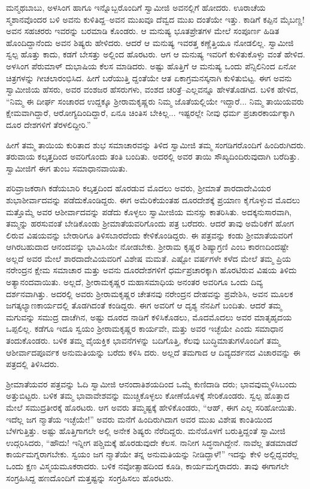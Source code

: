 ಮನ್ಮಥಬಾಬು, ಅಳಸಿಂಗ ಹಾಗೂ ಇನ್ನೊಬ್ಬರೊಂದಿಗೆ ಸ್ವಾಮೀಜಿ ಅವನಲ್ಲಿಗೆ ಹೋದರು. ಊರಾಚೆಯ ಸ್ಮಶಾನವೊಂದರ ಬಳಿ ಅವನು ಕುಳಿತಿದ್ದ–ಅವನ ಮುಖವೂ ದೆವ್ವದ ಮುಖ ದಂತೆಯೇ ಇತ್ತು. ಕಾಡಿಗೆ ಕಪ್ಪಿನ ಮೈಬಣ್ಣ! ಅವನ ಸಹಚರರು ಇವರನ್ನು ಬರಮಾಡಿ ಕೊಂಡರು. ಆ ಮನುಷ್ಯ ಭೂತಪ್ರೇತಗಳ ಮೇಲೆ ಸಂಪೂರ್ಣ ಹಿಡಿತ ಹೊಂದಿದ್ದಾನೆಂದು ಅವನ ಶಿಷ್ಯರು ಹೇಳಿದರು. ಆದರೆ ಆ ಮನುಷ್ಯ ಇವರತ್ತ ಕಣ್ಣೆತ್ತಿಯೂ ನೋಡಲಿಲ್ಲ. ಸ್ವಾಮೀಜಿ ಸ್ವಲ್ಪ ಹೊತ್ತು ಕಾದು, ಕಡಗೆ ಬೇಸತ್ತು ಅಲ್ಲಿಂದ ಹೊರಟರು. ಆಗ ಆ ಮನುಷ್ಯ ಇವರಿಗೆ ಕುಳಿತುಕೊಳ್ಳು ವಂತೆ ಹೇಳಿದ. ಅಳಸಿಂಗ ಪೆರುಮಾಳ್ ದುಭಾಷಿಯ ಕೆಲಸ ಮಾಡಿದರು. ಅಷ್ಟು ಹೊತ್ತಿಗೆ ಆ ಮನುಷ್ಯ ಒಂದು ಪೆನ್ಸಿಲಿನಿಂದ ಏನೋ ಚಿತ್ರಗಳನ್ನು ಗೀಚಲಾರಂಭಿಸಿದ. ಹೀಗೆ ಬರೆಯುತ್ತಿ ದ್ದಂತೆಯೇ ಆತ ಏಕಾಗ್ರಮನಸ್ಕನಾಗಿ ಕುಳಿತುಬಿಟ್ಟ. ಈಗ ಅವನು ಸ್ವಾಮೀಜಿಯ ಹೆಸರು, ಅವರ ವಂಶಜರ ಹೆಸರುಗಳು, ವಂಶದ ಚರಿತ್ರೆ–ಎಲ್ಲವನ್ನೂ ಹೇಳತೊಡಗಿದ. ಬಳಿಕ ಹೇಳಿದ, “ನಿಮ್ಮ ಈ ದೀರ್ಘ ಸಂಚಾರದ ಉದ್ದಕ್ಕೂ ಶ್ರೀರಾಮಕೃಷ್ಣರು ನಿಮ್ಮ ಜೊತೆಯಲ್ಲಿಯೇ ಇದ್ದಾರೆ... ನಿಮ್ಮ ತಾಯಿಯವರು ಕ್ಷೇಮವಾಗಿದ್ದಾರೆ, ಆರೋಗ್ಯದಿಂದಿದ್ದಾರೆ, ಏನೂ ಚಿಂತಿಸ ಬೇಕಿಲ್ಲ... ಇಷ್ಟರಲ್ಲೇ ನೀವು ಧರ್ಮ ಪ್ರಚಾರಕಾರ್ಯಕ್ಕಾಗಿ ದೂರ ದೇಶಗಳಿಗೆ ತೆರಳಲಿದ್ದೀರಿ.”

ಹೀಗೆ ತಮ್ಮ ತಾಯಿಯ ಕುರಿತಾದ ಶುಭ ಸಮಾಚಾರವನ್ನು ತಿಳಿದ ಸ್ವಾಮೀಜಿ ತಮ್ಮ ಸಂಗಡಿಗರೊಂದಿಗೆ ಹಿಂದಿರುಗಿದರು. ತರುವಾಯ ಕಲ್ಕತ್ತದಿಂದ ಅವರಿಗೊಂದು ತಂತಿ ಬಂದಿತು. ಅದರಲ್ಲಿ ಅವರ ತಾಯಿ ಸೌಖ್ಯದಿಂದಿರುವುದಾಗಿ ಬರೆದಿತ್ತು. ಸ್ವಾಮೀಜಿಗೆ ಈಗ ತುಂಬ ಸಮಾಧಾನವಾಯಿತು.

ಪರಿವ್ರಾಜಕರಾಗಿ ಕಡೆಯಬಾರಿ ಕಲ್ಕತ್ತದಿಂದ ಹೊರಡುವ ಮೊದಲು ಅವರು, ಶ್ರೀಮಾತೆ ಶಾರದಾದೇವಿಯರ ಶುಭಾಶೀರ್ವಾದವನ್ನು ಪಡೆದುಕೊಂಡಿದ್ದರು. ಈಗ ಅಮೆರಿಕೆಯಂತಹ ದೂರದೇಶಕ್ಕೆ ಪ್ರಯಾಣ ಕೈಗೊಳ್ಳುವ ಮೊದಲು ಮತ್ತೊಮ್ಮೆ ಅವರ ಆಶೀರ್ವಾದವನ್ನು ಪಡೆದು ಕೊಳ್ಳಲು ಸ್ವಾಮೀಜಿಯ ಮನಸ್ಸು ಕಾತರಿಸಿತು. ಅದಕ್ಕನುಸಾರವಾಗಿ, ತಮ್ಮನ್ನು ಹರಸುವಂತೆ ಬೇಡಿಕೊಂಡು ಶ್ರೀಮಾತೆಯವರಿಗೊಂದು ಪತ್ರ ಬರೆದರು. ಆದರೆ ತಾವು ಅಮೆರಿಕೆಗೆ ಹೋಗ ಲಿರುವ ವಿಷಯವನ್ನು ಬೇರಾರಿಗೂ ತಿಳಿಸಬಾರದೆಂದು ಕೇಳಿಕೊಂಡಿದ್ದರು. ಈ ಪತ್ರವನ್ನು ಕಂಡು ಶ್ರೀಮಾತೆಯವರಿಗೆ ಆಗಿರಬಹುದಾದ ಆನಂದವನ್ನು ಭಾವಿಸಿಯೇ ನೋಡಬೇಕು. ಶ್ರೀರಾಮ ಕೃಷ್ಣರ ಶಿಷ್ಯಾಗ್ರಣಿ ಎಂಬ ಕಾರಣದಿಂದಷ್ಟೇ ಅಲ್ಲದೆ ಅವರ ಮೇಲೆ ಶಾರದಾದೇವಿಯವರಿಗೆ ವಿಶೇಷ ಮಮತೆ. ಎಷ್ಟೋ ವರ್ಷಗಳೇ ಕಳೆದ ಮೇಲೆ ತಮ್ಮ ಪ್ರಿಯ ನರೇಂದ್ರನ ಕ್ಷೇಮ ಸಮಾಚಾರ ಮತ್ತು ಅವನು ದೂರದೇಶಗಳಿಗೆ ಧರ್ಮಪ್ರಚಾರಕ್ಕಾಗಿ ಹೊರಟಿರುವ ವಿಷಯ ತಿಳಿದು ಅತ್ಯಾನಂದವಾಯಿತು. ಅಲ್ಲದೆ, ಶ್ರೀರಾಮಕೃಷ್ಣರ ಮಹಾಸಮಾಧಿಯ ಅನಂತರ ಅವರಿಗೂ ಒಂದು ದಿವ್ಯ ದರ್ಶನವಾಗಿತ್ತು. ಅದರಲ್ಲಿ ಅವರು ಶ್ರೀರಾಮಕೃಷ್ಣರ ಚೇತನವು ನರೇಂದ್ರನ ದೇಹವನ್ನು ಪ್ರವೇಶಿಸಿ, ಅವನ ಮೂಲಕ ಜಗತ್ಕಲ್ಯಾಣಕಾರ್ಯದಲ್ಲಿ ತೊಡಗಿದಂತೆ ಕಂಡಿದ್ದರು. ಈಗ ಅವರಿಗೆ ಆ ದೃಶ್ಯ ನೆನಪಿಗೆ ಬಂದಿತು. ಆದರೆ ತಮ್ಮ ಮಗುವನ್ನು ಸಮುದ್ರ ದಾಚೆಗಿನ, ಅಷ್ಟು ದೂರದ ನಾಡಿಗೆ ಕಳಿಸಿಕೊಡಲು, ಮೊದಮೊದಲು ಅವರ ಮಾತೃಹೃದಯ ಒಪ್ಪಲಿಲ್ಲ. ಕಡೆಗೂ ಇದೂ ಸ್ವಯಂ ಶ್ರೀರಾಮಕೃಷ್ಣರ ಕಾರ್ಯವೇ, ಮತ್ತು ಅವರ ಇಚ್ಛೆಯೇ ಎಂದು ಸಮಾಧಾನ ತಂದುಕೊಂಡರು. ಬಳಿಕ ತಮ್ಮ ವೈಯಕ್ತಿಕ ಭಾವನೆಗಳನ್ನು ಬದಿಗೊತ್ತಿ, ಕೆಲವು ಬುದ್ಧಿಮಾತುಗಳೊಂದಿಗೆ ತಮ್ಮ ಆಶೀರ್ವಾದಪೂರ್ವಕ ಅನುಮತಿಯನ್ನು ಬರೆದು ಕಳಿಸಿ ದರು. ಅಲ್ಲದೆ ತಮಗಾದ ಆ ದಿವ್ಯದರ್ಶನದ ವಿಚಾರವನ್ನು ಈ ಪತ್ರದಲ್ಲಿ ತಿಳಿಸಿದರು.

ಶ್ರೀಮಾತೆಯವರ ಪತ್ರವನ್ನು ಓದಿ ಸ್ವಾಮೀಜಿ ಆನಂದಾತಿಶಯದಿಂದ ಒಮ್ಮೆ ಕುಣಿದಾಡಿ ದರು; ಭಾವವುಮ್ಮಳಿಸಿಬಂದು ಅತ್ತುಬಿಟ್ಟರು. ಬಳಿಕ ತಮ್ಮ ಭಾವಾವೇಶವನ್ನು ಮುಚ್ಚಿಕೊಳ್ಳಲು ಕೋಣೆಯೊಳಕ್ಕೆ ಸೇರಿಕೊಂಡರು. ಸ್ವಲ್ಪ ಹೊತ್ತಾದ ಮೇಲೆ ಸಮುದ್ರತೀರಕ್ಕೆ ಹೊರಟರು. ಆಗ ಅವರು ತಮ್ಮಷ್ಟಕ್ಕೆ ಹೇಳಿಕೊಂಡರು, “ಆಹ್, ಈಗ ಎಲ್ಲ ಸರಿಹೋಯಿತು. ಇದೆಲ್ಲ ಜಗ ನ್ಮಾತೆಯ ಇಚ್ಛೆಯೇ!” ಅವರು ಮನೆಗೆ ಹಿಂದಿರುಗಿದಾಗ ಅವರ ಮುಖ ವಿಶೇಷ ಕಾಂತಿಯಿಂದ ಬೆಳಗುತ್ತಿತ್ತು. ಅಷ್ಟು ಹೊತ್ತಿಗಾಗಲೇ ಅಲ್ಲಿ ಅನೇಕ ಶಿಷ್ಯರು ನೆರೆದಿದ್ದರು. ಮನೆಯೊಳಗೆ ಬರುತ್ತಿದ್ದಂತೆ ಸ್ವಾಮೀಜಿ ಉದ್ಗರಿಸಿದರು, “ಹೌದು! ಇನ್ನೀಗ ಪಶ್ಚಿಮಕ್ಕೆ ಹೊರಡುವುದೇ ಕೆಲಸ. ನಾನೀಗ ಸಿದ್ಧನಾಗಿದ್ದೇನೆ. ನಾವೆಲ್ಲ ತಡಮಾಡದೆ ಕಾರ್ಯಮಗ್ನರಾಗಬೇಕು. ಸ್ವಯಂ ಜಗ ನ್ಮಾತೆಯೇ ತನ್ನ ಅನುಮತಿಯನ್ನು ನೀಡಿದ್ದಾಳೆ!” ಇದನ್ನು ಕೇಳಿ ಅಲ್ಲಿದ್ದವರೆಲ್ಲ ಒಂದು ಕ್ಷಣ ವಿಸ್ಮಯಮೂಕರಾದರು. ಬಳಿಕ ನವೋತ್ಸಾಹದಿಂದ ಕೂಡಿ, ಕಾರ್ಯಮಗ್ನರಾದರು. ತಾವು ಈಗಾಗಲೇ ಸಂಗ್ರಹಿಸಿದ್ದ ಹಣದೊಂದಿಗೆ ಮತ್ತಷ್ಟನ್ನು ಸಂಗ್ರಹಿಸಲು ಹೊರಟರು.


